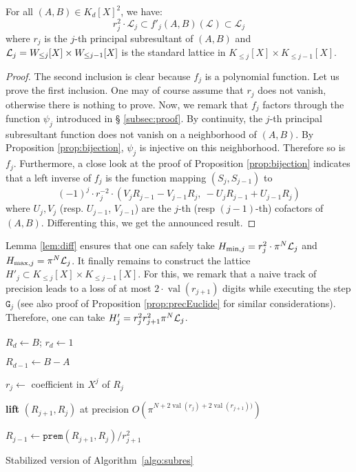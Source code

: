 \documentclass{article}
\DeclareMathOperator{\val}{val}
\begin{document}
\begin{lem}
\label{lem:diff}
For all $(A,B) \in K_d[X]^2$, we have:
$$r_j^2 \cdot \mathcal L_j 
\subset f'_j(A,B)(\mathcal L) \subset \mathcal L_j$$
where $r_j$ is the $j$-th principal subresultant of $(A,B)$ and
$\mathcal L_j = W_{\leq j}[X] \times W_{\leq j-1}[X]$ is the standard
lattice in $K_{\leq j}[X] \times K_{\leq j-1}[X]$.
\end{lem}

\begin{proof}
The second inclusion is clear because $f_j$ is a polynomial function. 
Let us prove the first inclusion. One may of course assume that $r_j$ 
does not vanish, otherwise there is nothing to prove. Now, we remark 
that $f_j$ factors through the function $\psi_j$ introduced in \S 
\ref{subsec:proof}. By continuity, the $j$-th principal subresultant 
function does not vanish on a neighborhood of $(A,B)$. By Proposition 
\ref{prop:bijection}, $\psi_j$ is injective on this neighborhood. 
Therefore so is $f_j$. Furthermore, a close look at the proof of 
Proposition \ref{prop:bijection} indicates that a left inverse of $f_j$ 
is the function mapping $(S_j, S_{j-1})$ to
$$(-1)^j \cdot r_j^{-2} \cdot 
(V_j R_{j-1}{-}V_{j-1} R_j,\: -U_j R_{j-1}{+}U_{j-1} R_j)$$
where $U_j, V_j$ (resp. $U_{j-1}$, $V_{j-1}$) are the $j$-th (resp 
$(j-1)$-th) cofactors of $(A,B)$. Differenting this, we get the
announced result.
\end{proof}

Lemma \ref{lem:diff} ensures that one can safely take $H_{\text{\rm min},j} = 
r_j^2 \cdot \pi^N \mathcal L_j$ and $H_{\text{\rm max},j} = \pi^N \mathcal L_j$. It finally 
remains to construct the lattice $H'_j \subset K_{\leq j}[X] \times 
K_{\leq j-1}[X]$. For this, we remark that a naive track of precision 
leads to a loss of at most $2 \cdot \val(r_{j+1})$ digits while 
executing the step $\texttt{G}_j$ (see also proof of Proposition 
\ref{prop:precEuclide} for similar considerations). Therefore, one can 
take $H'_j = r_j^2 r_{j+1}^2 \pi^N \mathcal L_j$.

\begin{algorithm}

  \BlankLine

  $R_d \leftarrow B$; $r_d \leftarrow 1$

  $R_{d-1} \leftarrow B-A$

    {$r_j \leftarrow$ coefficient in $X^j$ of $R_j$


     \textbf{lift} $(R_{j+1}, R_j)$ at precision $O(\pi^{N+2\val(r_j) + 2\val(r_{j+1}))})$

     $R_{j-1} \leftarrow \texttt{prem}(R_{j+1}, R_j) / r_{j+1}^2$
    }

\caption{Stabilized version of Algorithm~\ref{algo:subres}}
\label{algo:stabsubres}
\end{algorithm}
\end{document}
